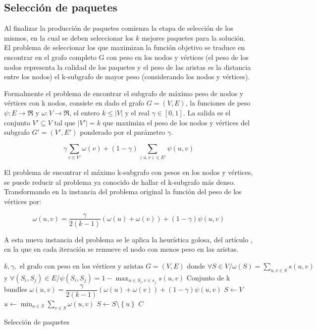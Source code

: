 \subsection{Selección de paquetes}
Al finalizar la producción de paquetes comienza la etapa de selección de los mismos, en la cual se deben seleccionar los $k$ mejores paquetes para la solución. El problema de seleccionar los que maximizan la función objetivo se traduce en encontrar en el grafo completo G con peso en los nodos y vértices (el peso de los nodos representa la calidad de los paquetes y el peso de las aristas es la distancia entre los nodos) el k-subgrafo de mayor peso (considerando los nodos y vértices).

Formalmente el problema de encontrar el subgrafo de máximo peso de nodos y vértices con k nodos, consiste en dado el grafo $ G = (V,E) $, la funciones de peso $\psi : E \rightarrow \Re$ y $\omega : V \rightarrow \Re$, el entero $ k \leq |V| $ y el real $\gamma \in [0,1]$. La salida es el conjunto $V' \subseteq V$ tal que $|V'| = k$ que maximiza el peso de los nodos y vértices del subgrafo $G' = (V', E')$ ponderado por el parámetro $\gamma$.

\begin{equation}
\gamma \sum_{v \in V'}{\omega(v)} + (1 - \gamma) \sum_{(u,v) \in E'}{\psi(u,v)}
\end{equation}

El problema de encontrar el máximo k-subgrafo con pesos en los nodos y vértices, se puede reducir al problema ya conocido de hallar el k-subgrafo más denso\cite{SubgraphProblem}. Transformando en la instancia del problema original la función del peso de los vértices por:
 
\begin{equation}
\omega(u,v) = \dfrac{\gamma}{2( k - 1)} (\omega(u) + \omega(v)) + (1 - \gamma)\psi(u,v) 
\end{equation}

A esta nueva instancia del problema se le aplica la heurística golosa, del artículo \cite{compositeRetrival}, en la que en cada iteración se remueve el nodo con menos peso en las aristas.

\begin{algorithm}[H]
\begin{algorithmic}[1]
\REQUIRE $k,\gamma,\text{ el grafo con peso en los vértices y aristas }G=(V,E) \text{ donde }\forall S \in V / \omega(S) = \sum_{u,v \in S}{s(u,v)}$ y $\forall (S_i,S_j) \in E / \psi(S_i,S_j) = 1 - \max_{u \in S_i, v \in s_j}{s(u,v)}$
\ENSURE Conjunto de k bundles
\STATE $\omega(u,v) = \dfrac{\gamma}{2( k - 1)} (\omega(u) + \omega(v)) + (1 - \gamma)\psi(u,v)$
\STATE $S \leftarrow V$
\STATE $u \leftarrow \min_{u \in S}{\sum_{v \in S}{\omega(u,v)}}$
\STATE $S \leftarrow S \setminus  \left\{u\right\} $
\ENDWHILE
\RETURN $C$
\end{algorithmic}
\caption{Selección de paquetes}\label{alg:chooseBundles}
\end{algorithm}

